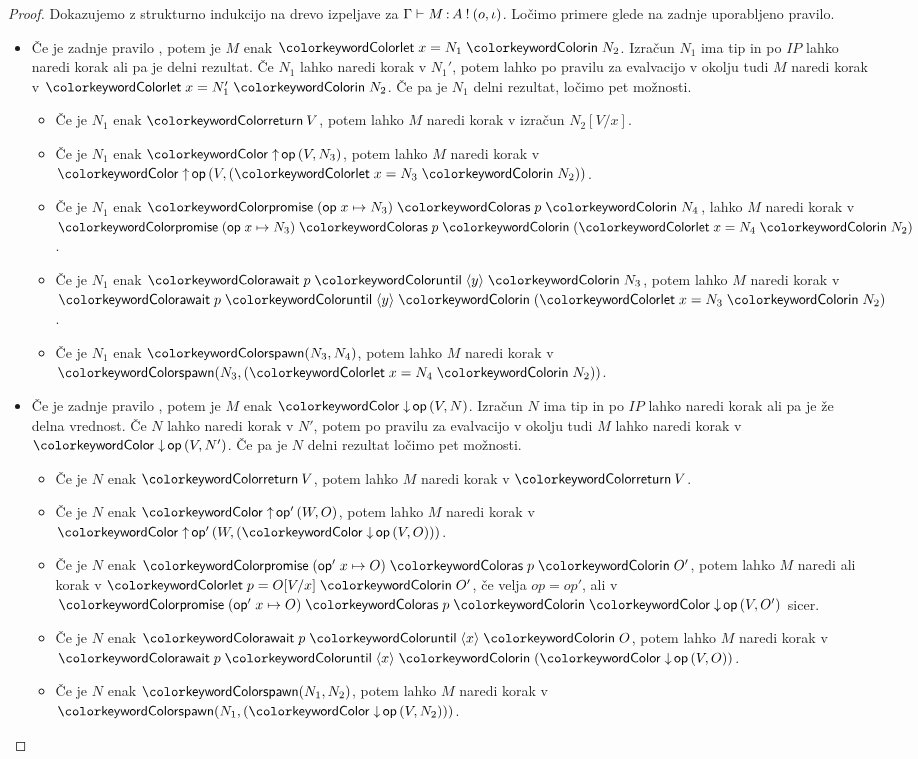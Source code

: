 \begin{proof}
	Dokazujemo z strukturno indukcijo na drevo izpeljave za $\Gamma \vdash M \mathinner{:} A \mathbin{!} (o, \iota)$.
	Ločimo primere glede na zadnje uporabljeno pravilo.
	
	\begin{itemize}
		\item Če je zadnje pravilo , potem je $M$ enak $\tmlet{x}{N_1}{N_2}$.
		Izračun $N_1$ ima tip in po $IP$ lahko naredi korak ali pa je delni rezultat. Če $N_1$ lahko naredi korak v $N_1'$, potem lahko po pravilu za evalvacijo v okolju tudi $M$ naredi korak v $\tmlet{x}{N_1'}{N_2}$.
		Če pa je $N_1$ delni rezultat, ločimo pet možnosti. 
		\begin{itemize}
			\item Če je $N_1$ enak $\tmreturn{V}$, potem lahko $M$ naredi korak v izračun $N_2[V/x]$.
			\item Če je $N_1$ enak $\tmopout{op}{V}{N_3}$, potem lahko $M$ naredi korak v $\tmopout{op}{V}{(\tmlet{x}{N_3}{N_2})}$.
			\item Če je $N_1$ enak $\tmwith{op}{x}{N_3}{p}{N_4}$, lahko $M$ naredi korak v $\tmwith{op}{x}{N_3}{p}{(\tmlet{x}{N_4}{N_2})}$.
			\item Če je $N_1$ enak $\tmawait{p}{y}{N_3}$, potem lahko $M$ naredi korak v $\tmawait{p}{y}{(\tmlet{x}{N_3}{N_2})}$.
			\item Če je $N_1$ enak $\tmspawn{N_3}{N_4}$, potem lahko $M$ naredi korak v $\tmspawn{N_3}{(\tmlet{x}{N_4}{N_2})}$.
		\end{itemize}
		
		
		
		\item Če je zadnje pravilo , potem je $M$ enak $\tmopin{op}{V}{N}$.
		Izračun $N$ ima tip in po $IP$ lahko naredi korak ali pa je že delna vrednost.
		Če $N$ lahko naredi korak v $N'$, potem po pravilu za evalvacijo v okolju tudi $M$ lahko naredi korak v $\tmopin{op}{V}{N'}$. 
		Če pa je $N$ delni rezultat ločimo pet možnosti.
		\begin{itemize}
			\item Če je $N$ enak $\tmreturn{V}$, potem lahko $M$ naredi korak v $\tmreturn{V}$.
			\item Če je $N$ enak $\tmopout{op'}{W}{O}$, potem lahko $M$ naredi korak v $\tmopout{op'}{W}{(\tmopin{op}{V}{O})}$.
			\item Če je $N$ enak $\tmwith{op'}{x}{O}{p}{O'}$, potem lahko $M$ naredi ali korak v $\tmlet{p}{O[V/x]}{O'}$, če velja $op = op'$, ali v $\tmwith{op'}{x}{O}{p}{\tmopin{op}{V}{O'}}$ sicer.
			\item Če je $N$ enak $\tmawait{p}{x}{O}$, potem lahko $M$ naredi korak v $\tmawait{p}{x}{(\tmopin{op}{V}{O})}$.
			\item Če je $N$ enak $\tmspawn{N_1}{N_2}$, potem lahko $M$ naredi korak v $\tmspawn{N_1}{(\tmopin{op}{V}{N_2})}$.
		\end{itemize}
		

\end{itemize}
\end{proof}
